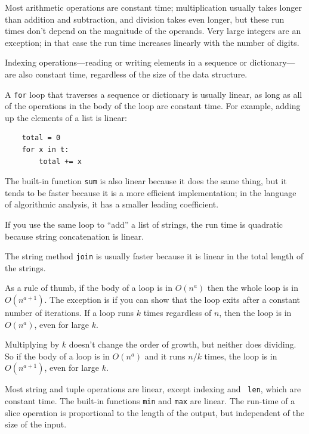 \documentclass[10pt]{book}
\begin{document}
Most arithmetic operations are constant time; multiplication
usually takes longer than addition and subtraction, and division
takes even longer, but these run times don't
depend on the magnitude of the operands.  Very large integers
are an exception; in that case the run time increases linearly
with the number of digits.

Indexing operations---reading or writing elements in a sequence
or dictionary---are also constant time, regardless of the size
of the data structure.

A {\tt for} loop that traverses a sequence or dictionary is
usually linear, as long as all of the operations in the body
of the loop are constant time.  For example, adding up the
elements of a list is linear:

\begin{verbatim}
    total = 0
    for x in t:
        total += x
\end{verbatim}

The built-in function {\tt sum} is also linear because it does
the same thing, but it tends to be faster because it is a more
efficient implementation; in the language of algorithmic analysis,
it has a smaller leading coefficient.

If you use the same loop to ``add'' a list of strings, the
run time is quadratic
because string concatenation is linear.

The string method {\tt join} is usually faster because it is
linear in the total length of the strings.

As a rule of thumb, if the body of a loop is in $O(n^a)$ then
the whole loop is in $O(n^{a+1})$.  The exception is if you can
show that the loop exits after a constant number of iterations.
If a loop runs $k$ times regardless of $n$, then
the loop is in $O(n^a)$, even for large $k$.

Multiplying by $k$ doesn't change the order of growth, but neither
does dividing.  So if the body of a loop is in $O(n^a)$ and it runs $n
/ k$ times, the loop is in $O(n^{a+1})$, even for large $k$.

Most string and tuple operations are linear, except indexing and {\tt
  len}, which are constant time.  The built-in functions {\tt min} and
{\tt max} are linear.  The run-time of a slice operation is
proportional to the length of the output, but independent of the size
of the input.
\end{document}
